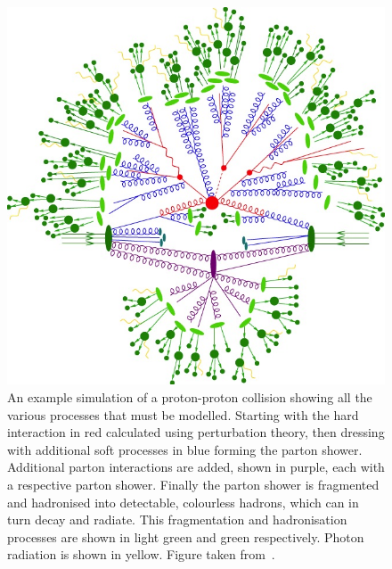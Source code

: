 \begin{figure}[htpb]
	\centering
	\includegraphics[width=\textwidth]{Figures/Generator_Event}
	\caption[An example simulation of a proton-proton collision showing all the various processes that must be modelled. Starting with the hard interaction in red calculated using perturbation theory, then dressing with additional soft processes in blue forming the parton shower. Additional parton interactions are added, shown in purple, each with a respective parton shower. Finally the parton shower is fragmented and hadronised into detectable, colourless hadrons, which can in turn decay and radiate. This fragmentation and hadronisation processes are shown in light green and green respectively. Photon radiation is shown in yellow. ]{An example simulation of a proton-proton collision showing all the various processes that must be modelled. Starting with the hard interaction in red calculated using perturbation theory, then dressing with additional soft processes in blue forming the parton shower. Additional parton interactions are added, shown in purple, each with a respective parton shower. Finally the parton shower is fragmented and hadronised into detectable, colourless hadrons, which can in turn decay and radiate. This fragmentation and hadronisation processes are shown in light green and green respectively. Photon radiation is shown in yellow.  Figure taken from~\cite{Gen:Event}.}
	\label{fig:GenEvent}
\end{figure}

